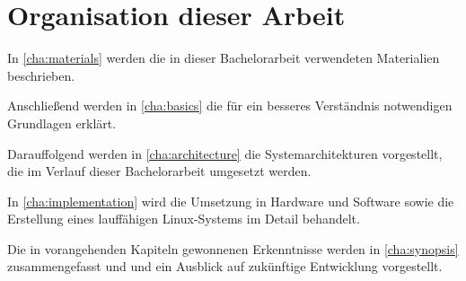 \section{Organisation dieser Arbeit}

In \cref{cha:materials} werden die in dieser Bachelorarbeit verwendeten Materialien beschrieben.

Anschließend werden in \cref{cha:basics} die für ein besseres Verständnis notwendigen Grundlagen erklärt.

Darauffolgend werden in \cref{cha:architecture} die Systemarchitekturen vorgestellt, die im Verlauf dieser Bachelorarbeit umgesetzt werden.

In \cref{cha:implementation} wird die Umsetzung in Hardware und Software sowie die Erstellung eines lauffähigen Linux-Systems im Detail behandelt. 

Die in vorangehenden Kapiteln gewonnenen Erkenntnisse werden in \cref{cha:synopsis} zusammengefasst und und ein Ausblick auf zukünftige Entwicklung vorgestellt. 
